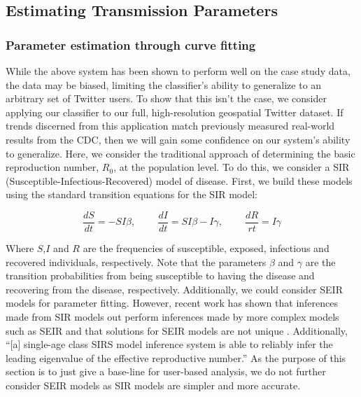 \subsection{Estimating Transmission Parameters}

\subsubsection{Parameter estimation through curve fitting}
\label{sec:curvefitting}

While the above system has been shown to perform well on the case study data\cite{Bodnar:2014:GVO:2567948.2579272}, the data may be biased, limiting the classifier's ability to generalize to an arbitrary set of Twitter users. To show that this isn't the case, we consider applying our classifier to our full, high-resolution geospatial Twitter dataset. If trends discerned from this application match previously measured real-world results from the CDC, then we will gain some confidence on our system's ability to generalize. Here, we consider the traditional approach of determining the basic reproduction number, \(R_0\), at the population level. To do this, we consider a SIR (Susceptible-Infectious-Recovered) model of disease. First, we build these models using the standard transition equations for the SIR model:


\begin{equation}
\frac{dS}{dt} = -SI\beta ,\;\; \;\; \;\; \;\;  \frac{dI}{dt} = SI\beta - I\gamma, \;\;\;\; \;\; \;\;  \frac{dR}{rt} = I\gamma
\end{equation}


Where \(S\),\(I\) and \(R\) are the frequencies of susceptible, exposed, infectious and recovered individuals, respectively.\cite{heesterbeek2002brief} Note that the parameters \(\beta\) and \(\gamma\) are the transition probabilities from being susceptible to having the disease and recovering from the disease, respectively. Additionally, we could consider SEIR models for parameter fitting. However, recent work has shown that inferences made from SIR models out perform inferences made by more complex models such as SEIR \cite{diekmann2012mathematical,yang2015inference} and that solutions for SEIR models are not unique \cite{bilge2014uniqueness}. Additionally, ``[a] single-age class SIRS model inference system is able to reliably infer the leading eigenvalue of the effective reproductive number.'' \cite{yang2015inference} As the purpose of this section is to just give a base-line for user-based analysis, we do not further consider SEIR models as SIR models are simpler and more accurate.

